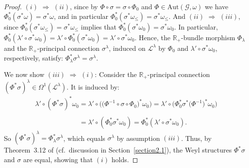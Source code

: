 \documentclass[pdftex]{sigma}
\def\R{\mathbb{R}}
\def\Gbdle{\mathcal{G}}
\theoremstyle{plain}
\theoremstyle{definition}
\begin{document}
\begin{proof} $(i)$ $\Rightarrow$ $(ii)$, since by $\Phi \circ \sigma = \sigma \circ \Phi_0$ and $\Phi \in \mathrm{Aut}(\Gbdle,\omega)$ we have $\Phi_0^*(\sigma^*\omega) = \sigma^*\omega$, and in particular $\Phi_0^*(\sigma^*\omega_{\leq}) = \sigma^*\omega_{\leq}$. And $(ii)$ $\Rightarrow$ $(iii)$, since $\Phi_0^*(\sigma^*\omega_{\leq}) = \sigma^*\omega_{\leq}$ implies that $\Phi_0^*(\sigma^*\omega_0) = \sigma^*\omega_0$. In particular, $\Phi_0^*(\lambda' \circ \sigma^*\omega_0) = \lambda' \circ \Phi_0^*(\sigma^*\omega_0) = \lambda' \circ \sigma^*\omega_0$. Hence, the $\R_+$-bundle morphism $\Phi_{\lambda}$ and the $\R_+$-principal connection $\sigma^{\lambda}$, induced on $\mathcal{L}^{\lambda}$ by $\Phi_0$ and $\lambda' \circ \sigma^*\omega_0$, respectively, satisfy: $\Phi_{\lambda}^* \sigma^{\lambda} = \sigma^{\lambda}$.

  We now show $(iii)$ $\Rightarrow$ $(i)$: Consider the $\R_+$-principal connection $(\Phi^*\sigma)^{\lambda} \in \Omega^1(\mathcal{L}^{\lambda})$. It is induced by:
\begin{gather*}
\lambda' \circ (\Phi^*\sigma)^*\omega_0  = \lambda' \circ \big(\big(\Phi^{-1}\circ \sigma \circ \Phi_0\big)^*\omega_0\big)
  = \lambda' \circ \big(\Phi_0^*\sigma^*\big(\Phi^{-1}\big)^*\omega_0\big) \\
\phantom{\lambda' \circ (\Phi^*\sigma)^*\omega_0}{} = \lambda' \circ (\Phi_0^*\sigma^*\omega_0) = \Phi_0^*(\lambda' \circ \sigma^*\omega_0).
\end{gather*}
So $(\Phi^*\sigma)^{\lambda} = \Phi_{\lambda}^*\sigma^{\lambda}$, which equals $\sigma^{\lambda}$ by assumption $(iii)$. Thus, by Theorem~3.12 of \cite{CS03} (cf.\ discussion in Section~\ref{section2.1}), the Weyl structures $\Phi^*\sigma$ and $\sigma$ are equal, showing that $(i)$ holds.


\end{proof}
\end{document}
